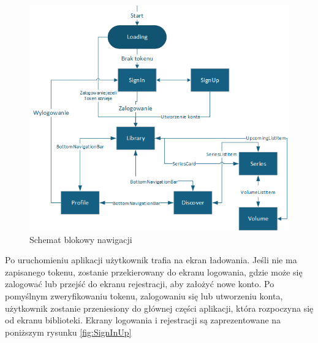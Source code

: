 \documentclass[12pt,twoside]{article}
\begin{document}
\begin{figure}[ht]
	\centering
	\includegraphics[width=1\textwidth]{figures/nawigacja.png}
	\caption{Schemat blokowy nawigacji}
\label{Fig:nawigacja}
\end{figure}
Po uruchomieniu aplikacji użytkownik trafia na ekran ładowania. Jeśli nie ma zapisanego tokenu, zostanie 
przekierowany do ekranu logowania, gdzie może się zalogować lub przejść do ekranu rejestracji, aby założyć nowe 
konto. Po pomyślnym zweryfikowaniu tokenu, zalogowaniu się lub utworzeniu konta, użytkownik zostanie przeniesiony 
do głównej części aplikacji, która rozpoczyna się od ekranu biblioteki. Ekrany logowania i rejestracji są 
zaprezentowane na poniższym rysunku \ref{fig:SignInUp}
\end{document}
